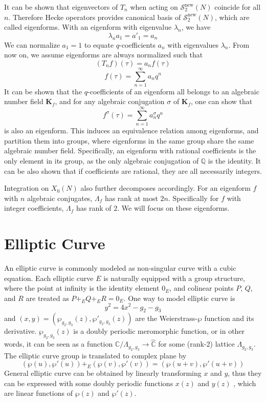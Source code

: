 \documentclass[]{article}
\begin{document}
It can be shown that eigenvectors of $T_n$ when acting on $\mathcal{S}_2^{\mbox{new}}(N)$ coincide for all $n$. Therefore Hecke operators provides canonical basis of $\mathcal{S}_2^{\mbox{new}}(N)$, which are called eigenforms. With an eigenform with eigenvalue $\lambda_n$, we have
\[
\lambda_n a_1 = a'_1 = a_n 
\]
We can normalize $a_1 = 1$ to equate $q$-coefficients $a_n$ with eigenvalues $\lambda_n$. From now on, we assume eigenforms are always normalized such that
\[
(T_n f)(\tau) = a_n f(\tau)
\]
\[
f(\tau) = \sum_{n=1}^{\infty} a_nq^n
\]
It can be shown that the $q$-coefficients of an eigenform all belongs to an algebraic number field $\mathbf{K}_f$, and for any algebraic conjugation $\sigma$ of $\mathbf{K}_f$, one can show that
\[
f^{\sigma}(\tau) =  \sum_{n=1}^{\infty} a_n^{\sigma} q^n
\]
is also an eigenform. This induces an equivalence relation among eigenforms, and partition them into groups, where eigenforms in the same group share the same algebraic number field. Specifically, an eigenform with rational coefficients is the only element in its group, as the only algebraic conjugation of $\mathbb{Q}$ is the identity. It can be also shown that if coefficients are rational, they are all necessarily integers.

Integration on $X_0(N)$ also further decomposes accordingly. For an eigenform $f$ with $n$ algebraic conjugates, $\Lambda_f$ has rank at most $2n$. Specifically for $f$ with integer coefficients, $\Lambda_f$ has rank of $2$. We will focus on these eigenforms.

\section{Elliptic Curve}
An elliptic curve is commonly modeled as non-singular curve with a cubic equation. Each elliptic curve $E$ is naturally equipped with a group structure, where the point at infinity is the identity element $0_{E}$, and colinear points $P$, $Q$, and $R$ are treated as $P +_{E} Q +_{E} R = 0_{E}$. One way to model elliptic curve is 
\[
y^2 = 4x^2 - g_2 - g_3
\]
and $(x, y) = (\wp_{g_2, g_3}(z), \wp'_{g_2, g_3}(z))$ are the Weierstrass-$\wp$ function and its derivative. $\wp_{g_2, g_3}(z)$ is a doubly periodic meromorphic function, or in other words, it can be seen as a function $\mathbb{C}/\Lambda_{g_2,g_3} \to \hat{\mathbb{C}}$ for some (rank-2) lattice $\Lambda_{g_2,g_3}$. The elliptic curve group is translated to complex plane by
\[
(\wp(u), \wp'(u)) +_E (\wp(v), \wp'(v)) = (\wp(u + v), \wp'(u + v))
\]
General elliptic curve can be obtained by linearly transforming $x$ and $y$, thus they can be expressed with some doubly periodic functions $x(z)$ and $y(z)$ , which are linear functions of $\wp(z)$ and $\wp'(z)$.
\end{document}
